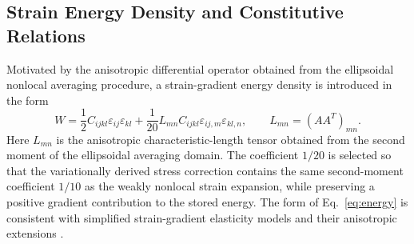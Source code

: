 \documentclass[final,3p,times,fleqn]{elsarticle}
\begin{document}
\subsection{Strain Energy Density and Constitutive Relations}

Motivated by the anisotropic differential operator obtained from the
ellipsoidal nonlocal averaging procedure, a strain-gradient energy
density is introduced in the form
\begin{equation}\label{eq:energy}
W
=
\frac{1}{2}
C_{ijkl}\varepsilon_{ij}\varepsilon_{kl}
+
\frac{1}{20}
L_{mn}
C_{ijkl}
\varepsilon_{ij,m}\varepsilon_{kl,n},
\qquad
L_{mn}=(AA^T)_{mn}.
\end{equation}
Here $L_{mn}$ is the anisotropic characteristic-length tensor obtained
from the second moment of the ellipsoidal averaging domain. The
coefficient $1/20$ is selected so that the variationally derived stress
correction contains the same second-moment coefficient $1/10$ as the
weakly nonlocal strain expansion, while preserving a positive gradient
contribution to the stored energy. The form of Eq.~\eqref{eq:energy} is
consistent with simplified strain-gradient elasticity models and their
anisotropic extensions
\cite{LazarPo2015,Polizzotto2018}.
\end{document}
